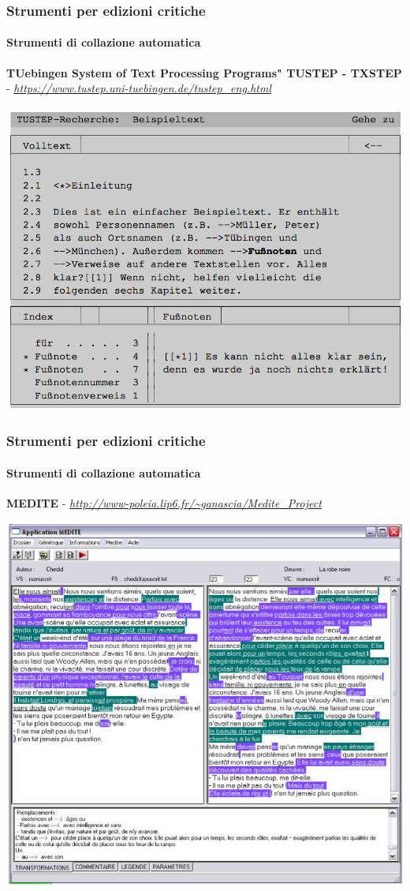 \begin{frame}
    \frametitle{Strumenti per edizioni critiche}
    \framesubtitle{Strumenti di collazione automatica}
	\addtocounter{nframe}{1}
    \begin{center}
        \textbf{TUebingen System of Text Processing Programs" TUSTEP - TXSTEP} - \textit{\url{https://www.tustep.uni-tuebingen.de/tustep_eng.html}}
    \end{center}
    \begin{center}
        \includegraphics[width=.75\textwidth]{imgs/tustep.png}
	\end{center}
\end{frame}

\begin{frame}
    \frametitle{Strumenti per edizioni critiche}
    \framesubtitle{Strumenti di collazione automatica}
	\addtocounter{nframe}{1}
    \begin{center}
        \textbf{MEDITE} - \textit{\url{http://www-poleia.lip6.fr/~ganascia/Medite\_Project}}
    \end{center}
    \begin{center}
        \includegraphics[width=.75\textwidth]{imgs/medite.png}
	\end{center}
\end{frame}



